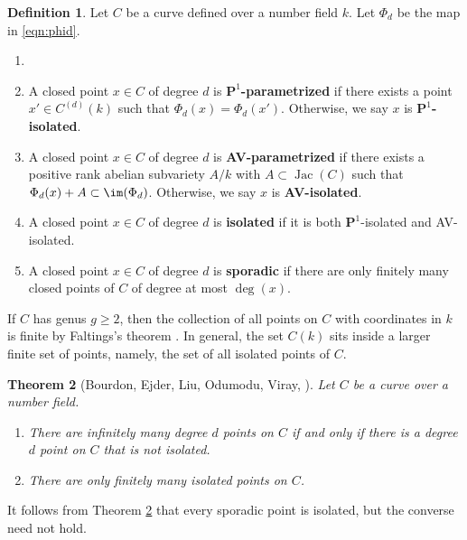 \documentclass[11pt,reqno]{amsart}
\theoremstyle{plain}
\newtheorem{theorem}{Theorem}%
\theoremstyle{definition}
\newtheorem{definition}[theorem]{Definition}
\newcommand{\PP}{\mathbf P}
\newcommand{\Jac}{\operatorname{Jac}}
\begin{document}
\begin{definition} Let $C$ be a curve defined over a number field $k$. Let $\Phi_d$ be the map in \eqref{eqn:phid}.
\begin{enumerate}
\item []
\item A closed point $x \in C$ of degree $d$ is $\PP^1$\textbf{-parametrized} if there exists a point $x' \in C^{(d)}(k)$ such that $\Phi_d(x)=\Phi_d(x')$. Otherwise, we say $x$ is $\PP^1$\textbf{-isolated}.
\item A closed point $x \in C$ of degree $d$ is \textbf{AV-parametrized} if there exists a positive rank abelian subvariety $A/k$ with  $A \subset \Jac(C)$ such that $\Phi_d(x)+A \subset \im(\Phi_d)$. Otherwise, we say $x$ is \textbf{AV-isolated}.
\item A closed point $x \in C$ of degree $d$ is \textbf{isolated} if it is both $\PP^1$-isolated and AV-isolated.
\item A closed point $x \in C$ of degree $d$ is \textbf{sporadic} if there are only finitely many closed points of $C$ of degree at most $\deg(x)$.
\end{enumerate}
\end{definition}

If $C$ has genus $g\geq 2$, then the collection of all points on $C$ with coordinates in $k$ is finite by Faltings's theorem \cite{faltings83}. In general, the set $C(k)$ sits inside a larger finite set of points, namely, the set of all isolated points of $C$.
    \begin{theorem}[{Bourdon, Ejder, Liu, Odumodu, Viray, \cite[Theorem 4.2]{BELOV}}]\label{thm:FiniteIsolated}
        Let $C$ be a curve over a number field.
        \begin{enumerate}
            \item There are infinitely many degree $d$ points on $C$ if and only if there is a degree $d$ point on $C$ that is \emph{not} isolated.
            \item There are only finitely many isolated points on $C$.
        \end{enumerate}
    \end{theorem}
It follows from Theorem \ref{thm:FiniteIsolated} that every sporadic point is isolated, but the converse need not hold.
\end{document}
